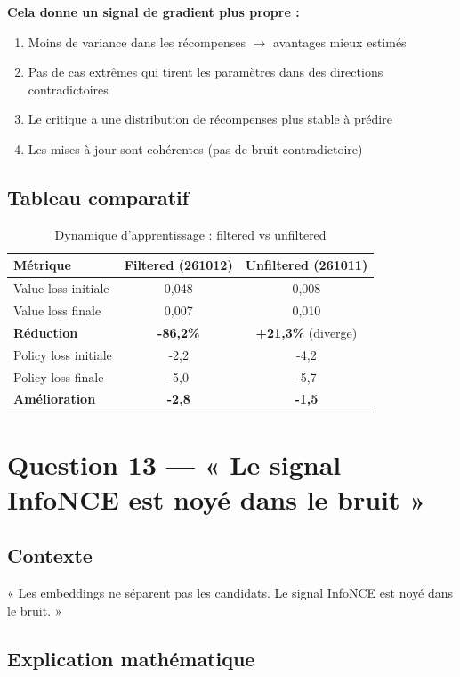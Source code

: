 \documentclass[11pt,a4paper]{article}
\begin{document}
\textbf{Cela donne un signal de gradient plus propre :}
\begin{enumerate}
    \item Moins de variance dans les récompenses $\rightarrow$ avantages mieux estimés
    \item Pas de cas extrêmes qui tirent les paramètres dans des directions contradictoires
    \item Le critique a une distribution de récompenses plus stable à prédire
    \item Les mises à jour sont cohérentes (pas de bruit contradictoire)
\end{enumerate}

\subsection{Tableau comparatif}

\begin{table}[h]
\centering
\begin{tabular}{lcc}
\toprule
\textbf{Métrique} & \textbf{Filtered (261012)} & \textbf{Unfiltered (261011)} \\
\midrule
Value loss initiale & 0{,}048 & 0{,}008 \\
Value loss finale & 0{,}007 & 0{,}010 \\
\textbf{Réduction} & \textbf{-86{,}2\%} & \textbf{+21{,}3\%} (diverge) \\
\midrule
Policy loss initiale & -2{,}2 & -4{,}2 \\
Policy loss finale & -5{,}0 & -5{,}7 \\
\textbf{Amélioration} & \textbf{-2{,}8} & \textbf{-1{,}5} \\
\bottomrule
\end{tabular}
\caption{Dynamique d'apprentissage : filtered vs unfiltered}
\end{table}

\section{Question 13 — « Le signal InfoNCE est noyé dans le bruit »}

\subsection{Contexte}

« Les embeddings ne séparent pas les candidats. Le signal InfoNCE est noyé dans le bruit. »

\subsection{Explication mathématique}
\end{document}
